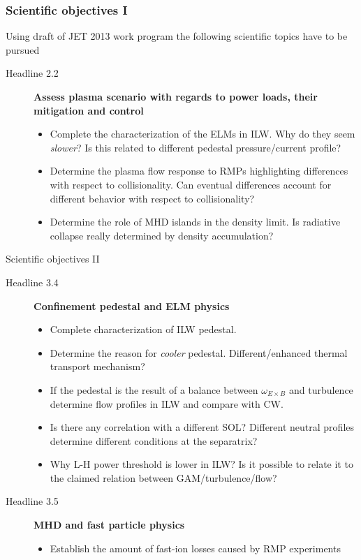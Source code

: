 \documentclass[t,10pt]{beamer}
\begin{document}
\begin{frame}
  \frametitle{Scientific objectives I}
  Using draft of JET 2013 work program the following scientific topics
  have to be pursued
  \begin{description}
  \item[Headline 2.2] \textbf{Assess plasma scenario with regards to
      power loads, their mitigation and control}
    \begin{itemize}
    \item Complete the characterization of the ELMs in ILW. Why do they
      seem \emph{slower}? Is this related to different pedestal
      pressure/current profile?
    \item Determine the plasma flow response to RMPs highlighting
      differences with respect to collisionality. Can eventual differences account for different behavior with respect to
      collisionality?
    \item Determine the role of MHD islands in the density limit. Is
      radiative collapse really determined by density accumulation?
    \end{itemize}
  \end{description}
\end{frame}
\begin{frame}{Scientific objectives II}
\begin{description}
\item[Headline 3.4] \textbf{Confinement pedestal and ELM physics}
    \begin{itemize}
    \item Complete characterization of ILW pedestal.
    \item Determine the
      reason for \emph{cooler} pedestal. Different/enhanced thermal
      transport mechanism?
    \item If the pedestal is the result of a balance between
      $\omega_{E\times B}$ and turbulence determine flow profiles in
      ILW and compare with CW.
    \item Is there any correlation with a different SOL? Different
      neutral profiles determine different conditions at the separatrix?
    \item Why L-H power threshold is lower in ILW? Is it possible to
      relate it to the claimed relation between GAM/turbulence/flow? 
    \end{itemize}
  \item[Headline 3.5] \textbf{MHD and fast particle physics}
    \begin{itemize}
    \item Establish the amount of fast-ion losses caused by RMP
      experiments
    \end{itemize}
  \end{description}
\end{frame}
\end{document}
